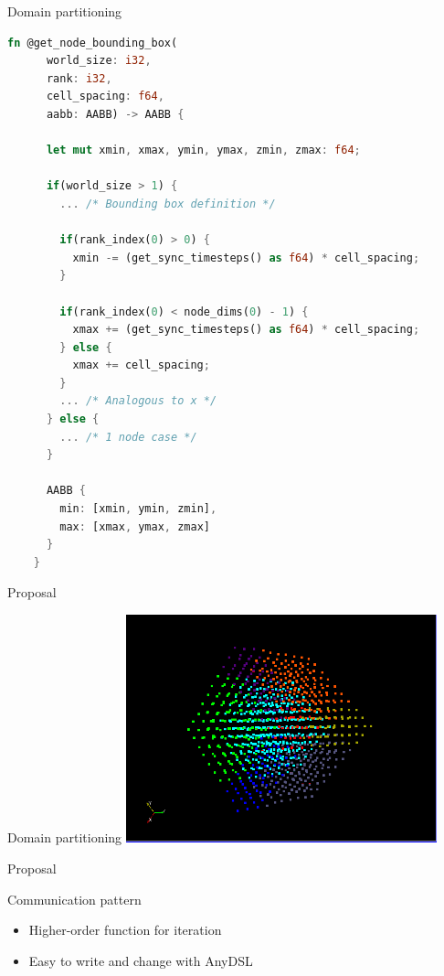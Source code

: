 \documentclass[aspectratio=43,t]{beamer}
\begin{document}
  \begin{frame}[fragile]{Domain partitioning}
    \begin{lstlisting}[basicstyle=\tiny\ttfamily,language=Rust]
    fn @get_node_bounding_box(
      world_size: i32,
      rank: i32,
      cell_spacing: f64,
      aabb: AABB) -> AABB {

      let mut xmin, xmax, ymin, ymax, zmin, zmax: f64;

      if(world_size > 1) {
        ... /* Bounding box definition */

        if(rank_index(0) > 0) {
          xmin -= (get_sync_timesteps() as f64) * cell_spacing;
        }

        if(rank_index(0) < node_dims(0) - 1) {
          xmax += (get_sync_timesteps() as f64) * cell_spacing;
        } else {
          xmax += cell_spacing;
        }
        ... /* Analogous to x */
      } else {
        ... /* 1 node case */
      }

      AABB {
        min: [xmin, ymin, zmin],
        max: [xmax, ymax, zmax]
      }
    }
    \end{lstlisting}
  \end{frame}

  \begin{frame}{Proposal}
    \begin{block}{Domain partitioning}
      \includegraphics[width=9cm]{domain_partitioning.png}
    \end{block}
  \end{frame}

  \begin{frame}{Proposal}
    \begin{block}{Communication pattern}
      \begin{itemize}
        \item Higher-order function for iteration
        \item Easy to write and change with AnyDSL
      \end{itemize}
    \end{block}
  \end{frame}
\end{document}
